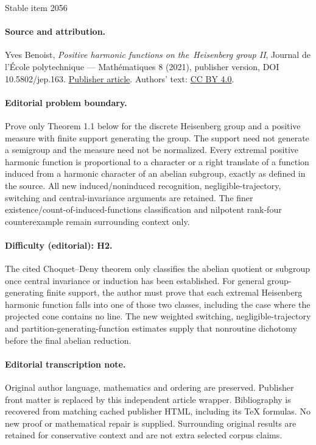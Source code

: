 \documentclass[11pt]{article}
\numberwithin{equation}{section}
\theoremstyle{definition}
\begin{document}
\begin{center}{\Large Stable item 2056}\end{center}
\paragraph{Source and attribution.}
Yves Benoist, \emph{Positive harmonic functions on the Heisenberg group II}, Journal de l’École polytechnique — Mathématiques 8 (2021), publisher version, DOI 10.5802/jep.163. \href{https://jep.centre-mersenne.org/articles/10.5802/jep.163/}{Publisher article}. Authors' text: \href{https://creativecommons.org/licenses/by/4.0/}{CC BY 4.0}.
\paragraph{Editorial problem boundary.}
Prove only Theorem 1.1 below for the discrete Heisenberg group and a positive measure with finite support generating the group. The support need not generate a semigroup and the measure need not be normalized. Every extremal positive harmonic function is proportional to a character or a right translate of a function induced from a harmonic character of an abelian subgroup, exactly as defined in the source. All new induced/noninduced recognition, negligible-trajectory, switching and central-invariance arguments are retained. The finer existence/count-of-induced-functions classification and nilpotent rank-four counterexample remain surrounding context only.
\paragraph{Difficulty (editorial): H2.}
The cited Choquet--Deny theorem only classifies the abelian quotient or subgroup once central invariance or induction has been established. For general group-generating finite support, the author must prove that each extremal Heisenberg harmonic function falls into one of those two classes, including the case where the projected cone contains no line. The new weighted switching, negligible-trajectory and partition-generating-function estimates supply that nonroutine dichotomy before the final abelian reduction.
\paragraph{Editorial transcription note.}
Original author language, mathematics and ordering are preserved. Publisher front matter is replaced by this independent article wrapper. Bibliography is recovered from matching cached publisher HTML, including its TeX formulas. No new proof or mathematical repair is supplied. Surrounding original results are retained for conservative context and are not extra selected corpus claims.
\clearpage
\end{document}
